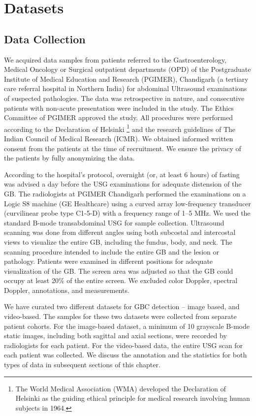 \chapter{Datasets}
%
\label{chap:data}
%
\section{Data Collection}
%
We acquired data samples from patients referred to the Gastroenterology, Medical Oncology or Surgical outpatient departments (OPD) of the Postgraduate Institute of Medical Education and Research (PGIMER), Chandigarh (a tertiary care referral hospital in Northern India) for abdominal Ultrasound examinations of suspected \gb pathologies. The data was retrospective in nature, and consecutive patients with non-acute presentation were included in the study. The Ethics Committee of PGIMER approved the study. All procedures were performed according to the Declaration of Helsinki \footnote{The World Medical Association (WMA) developed the Declaration of Helsinki as the guiding ethical principle for medical research involving human subjects in 1964.} \cite{helsinki} and the research guidelines of The Indian Council of Medical Research (ICMR). We obtained informed written consent from the patients at the time of recruitment. We ensure the privacy of the patients by fully anonymizing the data. 

\par According to the hospital's protocol, overnight (or, at least 6 hours) of fasting was advised a day before the USG examinations for adequate distension of the GB. The radiologists at PGIMER Chandigarh performed the examinations on a Logic S8 machine (GE Healthcare) using a curved array low-frequency transducer (curvilinear probe type C1-5-D) with a frequency range of 1--5 MHz. We used the standard B-mode transabdominal USG for sample collection. Ultrasound scanning was done from different angles using both subcostal and intercostal views to visualize the entire GB, including the fundus, body, and neck. The scanning procedure intended to include the entire GB and the lesion or pathology. Patients were examined in different positions for adequate visualization of the GB. The screen area was adjusted so that the GB could occupy at least 20\% of the entire screen. We excluded color Doppler, spectral Doppler, annotations, and measurements. 

\par We have curated two different datasets for GBC detection -- image based, and video-based. The samples for these two datasets were collected from separate patient cohorts. For the image-based dataset, a minimum of 10 grayscale B-mode static images, including both sagittal and axial sections, were recorded by radiologists for each patient. For the video-based data, the entire USG scan for each patient was collected. We discuss the annotation and the statistics for both types of data in subsequent sections of this chapter. 

